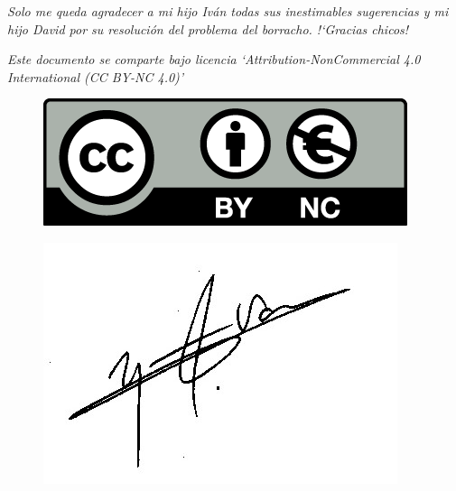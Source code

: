 \vspace{4mm} \emph{Solo me queda agradecer a mi hijo Iván todas sus inestimables sugerencias y mi hijo David por su resolución del problema del borracho. !`Gracias chicos!}

\vspace{5mm}
\justify

\emph{Este documento se comparte bajo licencia `Attribution-NonCommercial 4.0 International (CC BY-NC 4.0)'}


\begin{multicols}{2}
\begin{figure}[H]
	\centering
	\includegraphics[width=.4
	\textwidth]{imagenes/imagenes00/licencia.png}
\end{figure}
\begin{figure}[H]
	\centering
	\includegraphics[width=.3
	\textwidth]{imagenes/firma.png}
\end{figure}
\end{multicols}






